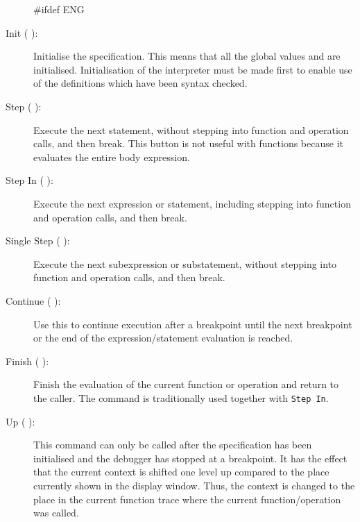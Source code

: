 \documentclass[\pformat,12pt]{article}
\newcommand{\guicmd}[1]{{\sf #1}}
\newcommand{\guicmd}[1]{{\gt #1}}
\begin{document}
\begin{description}
#ifdef ENG
\item[\guicmd{Init} (\hspace{-1.8mm}
\raisebox{-0.8mm}{\texttt{[image: runI.png]}}):]
Initialise the specification. This means that all the
  global values and  are initialised. Initialisation of the interpreter must be
made first to enable use of the definitions which have been syntax checked.

\item[\guicmd{Step} (\hspace{-1.8mm}
\raisebox{-0.8mm}{\texttt{[image: stepI.png]}}):] 
Execute the next statement, without stepping into
  function and operation calls,
  and then break. This button is not useful with functions because it
  evaluates the entire body expression.
  
\item[\guicmd{Step In} (\hspace{-1.8mm}
\raisebox{-0.8mm}{\texttt{[image: stepintoI.png]}}):] 
Execute the next expression or statement, including
  stepping into function and operation calls, and then
  break.
  
\item[\guicmd{Single Step} (\hspace{-1.8mm}
\raisebox{-0.8mm}{\texttt{[image: singlestepI.png]}}):] 
Execute the next subexpression or substatement, without
  stepping into function and operation calls, and then
  break.

\item[\guicmd{Continue} (\hspace{-1.8mm}
\raisebox{-0.8mm}{\texttt{[image: continueI.png]}}):] 
Use this to continue execution after a
  breakpoint until the next breakpoint or the end of the
  expression/statement evaluation is reached.
  
\item[\guicmd{Finish} (\hspace{-1.8mm}
\raisebox{-0.8mm}{\texttt{[image: stopI.png]}}):] 
Finish the evaluation of the current function
  or operation and return to the caller. The command is traditionally
  used together with {\tt Step In}.
  
\item[\guicmd{Up} (\hspace{-1.8mm}
\raisebox{-0.8mm}{\texttt{[image: upI.png]}}):] 
This command can only be called after the
specification has been initialised and the debugger has stopped at a
breakpoint. It has the effect that the current context is shifted one
level up compared to the place currently shown in the display
window. Thus, the context is changed to the place in the current
function trace where the current function/operation was called.


\end{description}
\end{document}
